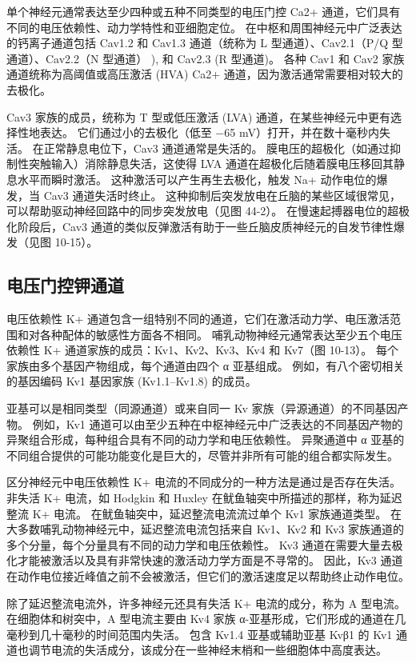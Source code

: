 单个神经元通常表达至少四种或五种不同类型的电压门控 Ca2+ 通道，它们具有不同的电压依赖性、动力学特性和亚细胞定位。 
在中枢和周围神经元中广泛表达的钙离子通道包括 Cav1.2 和 Cav1.3 通道（统称为 L 型通道）、Cav2.1（P/Q 型通道）、Cav2.2（N 型通道） ), 和 Cav2.3 (R 型通道)。 
各种 Cav1 和 Cav2 家族通道统称为高阈值或高压激活 (HVA) Ca2+ 通道，因为激活通常需要相对较大的去极化。


Cav3 家族的成员，统称为 T 型或低压激活 (LVA) 通道，在某些神经元中更有选择性地表达。 
它们通过小的去极化（低至 −65 mV）打开，并在数十毫秒内失活。 
在正常静息电位下，Cav3 通道通常是失活的。 膜电压的超极化（如通过抑制性突触输入）消除静息失活，这使得 LVA 通道在超极化后随着膜电压移回其静息水平而瞬时激活。 
这种激活可以产生再生去极化，触发 Na+ 动作电位的爆发，当 Cav3 通道失活时终止。 
这种抑制后突发放电在丘脑的某些区域很常见，可以帮助驱动神经回路中的同步突发放电（见图 44-2）。 
在慢速起搏器电位的超极化阶段后，Cav3 通道的类似反弹激活有助于一些丘脑皮质神经元的自发节律性爆发（见图 10-15）。


\subsection{电压门控钾通道}
电压依赖性 K+ 通道包含一组特别不同的通道，它们在激活动力学、电压激活范围和对各种配体的敏感性方面各不相同。 
哺乳动物神经元通常表达至少五个电压依赖性 K+ 通道家族的成员：Kv1、Kv2、Kv3、Kv4 和 Kv7（图 10-13）。 
每个家族由多个基因产物组成，每个通道由四个 α 亚基组成。 
例如，有八个密切相关的基因编码 Kv1 基因家族 (Kv1.1–Kv1.8) 的成员。


亚基可以是相同类型（同源通道）或来自同一 Kv 家族（异源通道）的不同基因产物。 
例如，Kv1 通道可以由至少五种在中枢神经元中广泛表达的不同基因产物的异聚组合形成，每种组合具有不同的动力学和电压依赖性。 
异聚通道中 α 亚基的不同组合提供的可能功能变化是巨大的，尽管并非所有可能的组合都实际发生。


区分神经元中电压依赖性 K+ 电流的不同成分的一种方法是通过是否存在失活。 
非失活 K+ 电流，如 Hodgkin 和 Huxley 在鱿鱼轴突中所描述的那样，称为延迟整流 K+ 电流。 
在鱿鱼轴突中，延迟整流电流流过单个 Kv1 家族通道类型。 
在大多数哺乳动物神经元中，延迟整流电流包括来自 Kv1、Kv2 和 Kv3 家族通道的多个分量，每个分量具有不同的动力学和电压依赖性。 
Kv3 通道在需要大量去极化才能被激活以及具有非常快速的激活动力学方面是不寻常的。 
因此，Kv3 通道在动作电位接近峰值之前不会被激活，但它们的激活速度足以帮助终止动作电位。


除了延迟整流电流外，许多神经元还具有失活 K+ 电流的成分，称为 A 型电流。 
在细胞体和树突中，A 型电流主要由 Kv4 家族 α-亚基形成，它们形成的通道在几毫秒到几十毫秒的时间范围内失活。 
包含 Kv1.4 亚基或辅助亚基 Kvβ1 的 Kv1 通道也调节电流的失活成分，该成分在一些神经末梢和一些细胞体中高度表达。


